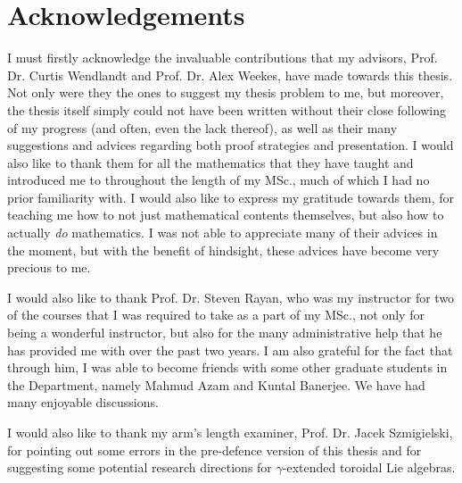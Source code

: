 \section*{Acknowledgements}
    I must firstly acknowledge the invaluable contributions that my advisors, Prof. Dr. Curtis Wendlandt and Prof. Dr. Alex Weekes, have made towards this thesis. Not only were they the ones to suggest my thesis problem to me, but moreover, the thesis itself simply could not have been written without their close following of my progress (and often, even the lack thereof), as well as their many suggestions and advices regarding both proof strategies and presentation. I would also like to thank them for all the mathematics that they have taught and introduced me to throughout the length of my MSc., much of which I had no prior familiarity with. I would also like to express my gratitude towards them, for teaching me how to not just mathematical contents themselves, but also how to actually \textit{do} mathematics. I was not able to appreciate many of their advices in the moment, but with the benefit of hindsight, these advices have become very precious to me.
    
    I would also like to thank Prof. Dr. Steven Rayan, who was my instructor for two of the courses that I was required to take as a part of my MSc., not only for being a wonderful instructor, but also for the many administrative help that he has provided me with over the past two years. I am also grateful for the fact that through him, I was able to become friends with some other graduate students in the Department, namely Mahmud Azam and Kuntal Banerjee. We have had many enjoyable discussions.

    I would also like to thank my arm's length examiner, Prof. Dr. Jacek Szmigielski, for pointing out some errors in the pre-defence version of this thesis and for suggesting some potential research directions for $\gamma$-extended toroidal Lie algebras.